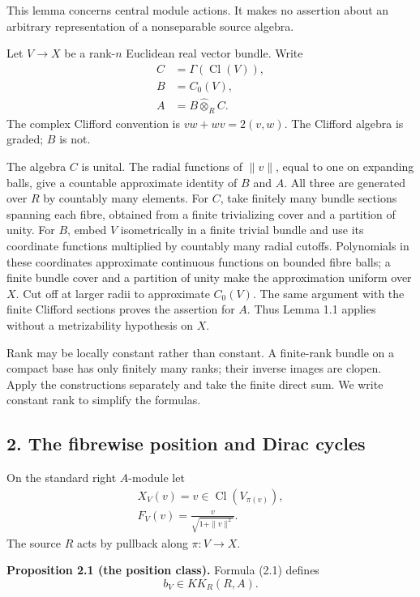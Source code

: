 \documentclass[
  11pt,
]{article}
\begin{document}
This lemma concerns central module actions. It makes no assertion about
an arbitrary representation of a nonseparable source algebra.

Let \(V\to X\) be a rank-\(n\) Euclidean real vector bundle. Write \[
\begin{aligned}
C&=\Gamma(\operatorname{Cl}(V)),\\
B&=C_0(V),\\
A&=B\widehat\otimes_R C.
\end{aligned}
\tag{1.1}
\] The complex Clifford convention is \(vw+wv=2(v,w)\). The Clifford
algebra is graded; \(B\) is not.

The algebra \(C\) is unital. The radial functions of \(\|v\|\), equal to
one on expanding balls, give a countable approximate identity of \(B\)
and \(A\). All three are generated over \(R\) by countably many
elements. For \(C\), take finitely many bundle sections spanning each
fibre, obtained from a finite trivializing cover and a partition of
unity. For \(B\), embed \(V\) isometrically in a finite trivial bundle
and use its coordinate functions multiplied by countably many radial
cutoffs. Polynomials in these coordinates approximate continuous
functions on bounded fibre balls; a finite bundle cover and a partition
of unity make the approximation uniform over \(X\). Cut off at larger
radii to approximate \(C_0(V)\). The same argument with the finite
Clifford sections proves the assertion for \(A\). Thus Lemma 1.1 applies
without a metrizability hypothesis on \(X\).

Rank may be locally constant rather than constant. A finite-rank bundle
on a compact base has only finitely many ranks; their inverse images are
clopen. Apply the constructions separately and take the finite direct
sum. We write constant rank to simplify the formulas.

\subsection{2. The fibrewise position and Dirac
cycles}\label{the-fibrewise-position-and-dirac-cycles}

On the standard right \(A\)-module let \[
\begin{gathered}
X_V(v)=v\in\operatorname{Cl}(V_{\pi(v)}),\\
F_V(v)=\frac{v}{\sqrt{1+\|v\|^2}}.
\end{gathered}
\tag{2.1}
\] The source \(R\) acts by pullback along \(\pi:V\to X\).

\textbf{Proposition 2.1 (the position class).} Formula (2.1) defines \[
b_V\in KK_R(R,A).
\tag{2.2}
\]
\end{document}
